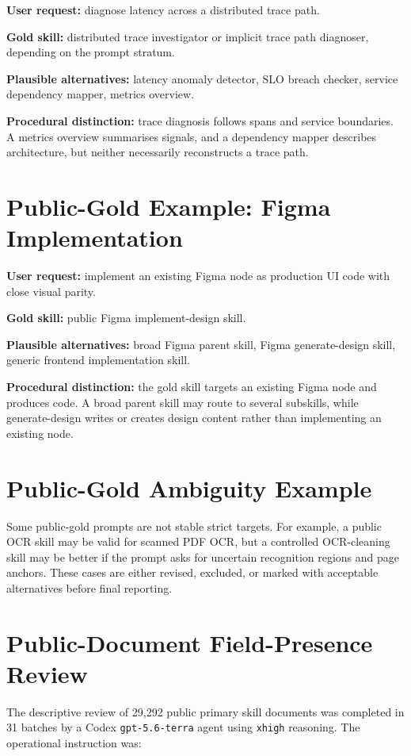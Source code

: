 \textbf{User request:} diagnose latency across a distributed trace path.

\textbf{Gold skill:} distributed trace investigator or implicit trace path diagnoser, depending on the prompt stratum.

\textbf{Plausible alternatives:} latency anomaly detector, SLO breach checker, service dependency mapper, metrics overview.

\textbf{Procedural distinction:} trace diagnosis follows spans and service boundaries. A metrics overview summarises signals, and a dependency mapper describes architecture, but neither necessarily reconstructs a trace path.

\section{Public-Gold Example: Figma Implementation}

\textbf{User request:} implement an existing Figma node as production UI code with close visual parity.

\textbf{Gold skill:} public Figma implement-design skill.

\textbf{Plausible alternatives:} broad Figma parent skill, Figma generate-design skill, generic frontend implementation skill.

\textbf{Procedural distinction:} the gold skill targets an existing Figma node and produces code. A broad parent skill may route to several subskills, while generate-design writes or creates design content rather than implementing an existing node.

\section{Public-Gold Ambiguity Example}

Some public-gold prompts are not stable strict targets. For example, a public OCR skill may be valid for scanned PDF OCR, but a controlled OCR-cleaning skill may be better if the prompt asks for uncertain recognition regions and page anchors. These cases are either revised, excluded, or marked with acceptable alternatives before final reporting.

\section{Public-Document Field-Presence Review}

The descriptive review of 29,292 public primary skill documents was completed in 31 batches by a Codex \texttt{gpt-5.6-terra} agent using \texttt{xhigh} reasoning. The operational instruction was:

